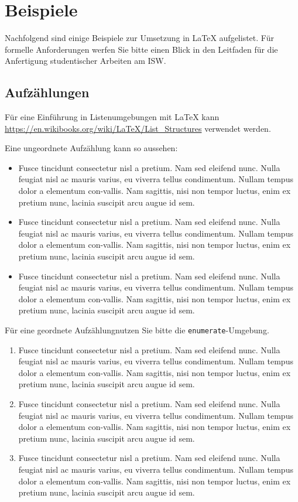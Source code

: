 \chapter{Beispiele}

Nachfolgend sind einige Beispiele zur Umsetzung in \LaTeX{} aufgelistet. Für formelle Anforderungen werfen Sie bitte einen Blick in den Leitfaden für die Anfertigung studentischer Arbeiten am ISW.

\section{Aufzählungen}

Für eine Einführung in Listenumgebungen mit \LaTeX{} kann \url{https://en.wikibooks.org/wiki/LaTeX/List_Structures} verwendet werden.

Eine ungeordnete Aufzählung kann so aussehen:

\begin{itemize}
    \item Fusce tincidunt consectetur nisl a pretium. Nam sed eleifend nunc. Nulla feugiat nisl ac mauris varius, eu viverra tellus condimentum. Nullam tempus dolor a elementum con-vallis. Nam sagittis, nisi non tempor luctus, enim ex pretium nunc, lacinia suscipit arcu augue id sem.
    \item Fusce tincidunt consectetur nisl a pretium. Nam sed eleifend nunc. Nulla feugiat nisl ac mauris varius, eu viverra tellus condimentum. Nullam tempus dolor a elementum con-vallis. Nam sagittis, nisi non tempor luctus, enim ex pretium nunc, lacinia suscipit arcu augue id sem.
    \item Fusce tincidunt consectetur nisl a pretium. Nam sed eleifend nunc. Nulla feugiat nisl ac mauris varius, eu viverra tellus condimentum. Nullam tempus dolor a elementum con-vallis. Nam sagittis, nisi non tempor luctus, enim ex pretium nunc, lacinia suscipit arcu augue id sem.
\end{itemize}

Für eine geordnete Aufzählungnutzen Sie bitte die \texttt{enumerate}-Umgebung.

\begin{enumerate}
    \item Fusce tincidunt consectetur nisl a pretium. Nam sed eleifend nunc. Nulla feugiat nisl ac mauris varius, eu viverra tellus condimentum. Nullam tempus dolor a elementum con-vallis. Nam sagittis, nisi non tempor luctus, enim ex pretium nunc, lacinia suscipit arcu augue id sem.
    \item Fusce tincidunt consectetur nisl a pretium. Nam sed eleifend nunc. Nulla feugiat nisl ac mauris varius, eu viverra tellus condimentum. Nullam tempus dolor a elementum con-vallis. Nam sagittis, nisi non tempor luctus, enim ex pretium nunc, lacinia suscipit arcu augue id sem.
    \item Fusce tincidunt consectetur nisl a pretium. Nam sed eleifend nunc. Nulla feugiat nisl ac mauris varius, eu viverra tellus condimentum. Nullam tempus dolor a elementum con-vallis. Nam sagittis, nisi non tempor luctus, enim ex pretium nunc, lacinia suscipit arcu augue id sem.
\end{enumerate}

